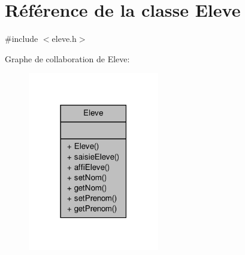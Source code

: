 \hypertarget{class_eleve}{\section{Référence de la classe Eleve}
\label{class_eleve}
}


{\ttfamily \#include $<$eleve.\-h$>$}



Graphe de collaboration de Eleve\-:
\nopagebreak
\begin{figure}[H]
\begin{center}
\leavevmode
\includegraphics[width=162pt]{class_eleve__coll__graph}
\end{center}
\end{figure}

